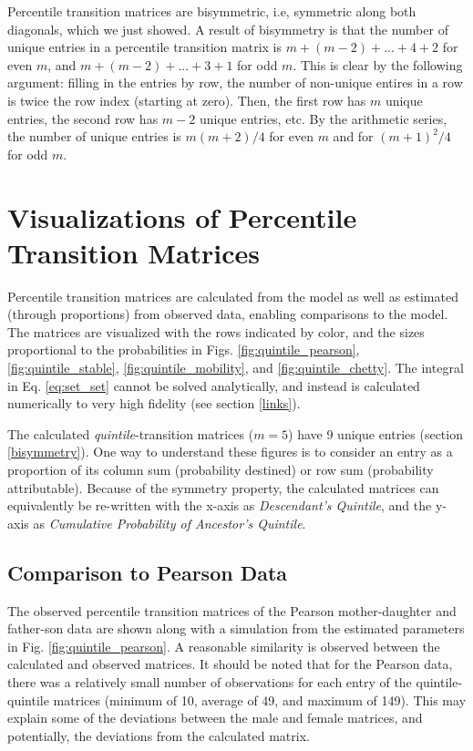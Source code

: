 \documentclass{svproc} %
\begin{document}
Percentile transition matrices are bisymmetric, i.e, symmetric along both diagonals, which we just showed. A result of bisymmetry is that the number of unique entries in a percentile transition matrix is $m + (m-2) + ... + 4 + 2$ for even $m$, and $m + (m-2) + ... + 3 + 1$ for odd $m$. This is clear by the following argument: filling in the entries by row, the number of non-unique entires in a row is twice the row index (starting at zero). Then, the first row has $m$ unique entries, the second row has $m-2$ unique entries, etc. By the arithmetic series, the number of unique entries is $m(m+2)/4$ for even $m$ and for $(m+1)^2/4$ for odd $m$. 



\section{Visualizations of Percentile Transition Matrices} \label{visuals}

Percentile transition matrices are calculated from the model as well as estimated (through proportions) from observed data, enabling comparisons to the model. The matrices are visualized with the rows indicated by color, and the sizes proportional to the probabilities in Figs. \ref{fig:quintile_pearson}, \ref{fig:quintile_stable}, \ref{fig:quintile_mobility}, and \ref{fig:quintile_chetty}. The integral in Eq. \ref{eq:set_set} cannot be solved analytically, and instead is calculated numerically to very high fidelity (see section \ref{links}). 

The calculated \emph{quintile}-transition matrices ($m = 5$) have 9 unique entries (section \ref{bisymmetry}). One way to understand these figures is to consider an entry as a proportion of its column sum (probability destined) or row sum (probability attributable). Because of the symmetry property, the calculated matrices can equivalently be re-written with the x-axis as \emph{Descendant's Quintile}, and the y-axis as \emph{Cumulative Probability of Ancestor's Quintile}. 


\subsection{Comparison to Pearson Data}

The observed percentile transition matrices of the Pearson mother-daughter and father-son data are shown along with a simulation from the estimated parameters in Fig. \ref{fig:quintile_pearson}. A reasonable similarity is observed between the calculated and observed matrices. It should be noted that for the Pearson data, there was a relatively small number of observations for each entry of the quintile-quintile matrices (minimum of 10, average of 49, and maximum of 149). This may explain some of the deviations between the male and female matrices, and potentially, the deviations from the calculated matrix. 
\end{document}
